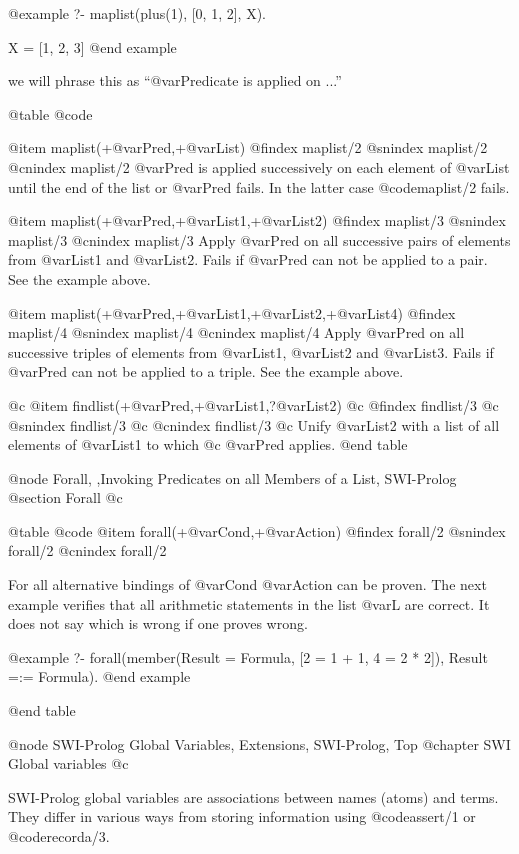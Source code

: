 @example
?- maplist(plus(1), [0, 1, 2], X).

X = [1, 2, 3]
@end example

we will phrase this as ``@var{Predicate} is applied on ...''

@table @code

@item maplist(+@var{Pred},+@var{List})
@findex maplist/2
@snindex maplist/2
@cnindex maplist/2
@var{Pred} is applied successively on each element of @var{List} until
the end of the list or @var{Pred} fails. In the latter case 
@code{maplist/2} fails.

@item maplist(+@var{Pred},+@var{List1},+@var{List2})
@findex maplist/3
@snindex maplist/3
@cnindex maplist/3
Apply @var{Pred} on all successive pairs of elements from
@var{List1} and
@var{List2}. Fails if @var{Pred} can not be applied to a
pair. See the example above.

@item maplist(+@var{Pred},+@var{List1},+@var{List2},+@var{List4})
@findex maplist/4
@snindex maplist/4
@cnindex maplist/4
Apply @var{Pred} on all successive triples of elements from @var{List1},
@var{List2} and @var{List3}. Fails if @var{Pred} can not be applied to a
triple. See the example above.

@c @item findlist(+@var{Pred},+@var{List1},?@var{List2})
@c @findex findlist/3
@c @snindex findlist/3
@c @cnindex findlist/3
@c Unify @var{List2} with a list of all elements of @var{List1} to which
@c @var{Pred} applies.
@end table

@node Forall, ,Invoking Predicates on all Members of a List, SWI-Prolog
@section Forall			
@c \label{sec:forall2}

@table @code
@item forall(+@var{Cond},+@var{Action})
@findex forall/2
@snindex forall/2
@cnindex forall/2

For all alternative bindings of @var{Cond} @var{Action} can be proven.
The next example verifies that all arithmetic statements in the list
@var{L} are correct. It does not say which is wrong if one proves wrong.

@example
?- forall(member(Result = Formula, [2 = 1 + 1, 4 = 2 * 2]),
                 Result =:= Formula).
@end example

@end table

@node SWI-Prolog Global Variables,  Extensions, SWI-Prolog, Top
@chapter SWI Global variables
@c		\label{sec:gvar}

SWI-Prolog global variables are associations between names (atoms) and
terms.  They differ in various ways from storing information using
@code{assert/1} or @code{recorda/3}.

